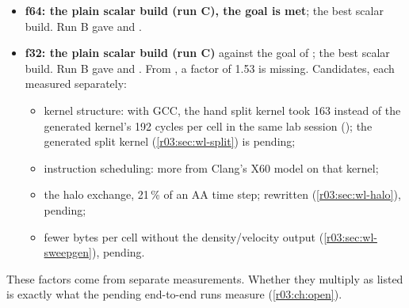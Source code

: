 \begin{keyidea}
\begin{itemize}
  \item \textbf{f64:  the plain scalar build (run C), the  goal is met};
         the best scalar build. Run B gave  and .
  \item \textbf{f32:  the plain scalar build (run C)} against the goal of ;
         the best scalar build. Run B gave  and . From , a
        factor of 1.53 is missing. Candidates, each measured separately:
        \begin{itemize}
          \item kernel structure: with GCC, the hand split kernel took 163 instead of the
                generated kernel's 192 cycles per cell in the same lab session (); the
                generated split kernel (\cref{r03:sec:wl-split}) is pending;
          \item instruction scheduling:  more from Clang's X60 model on that kernel;
          \item the halo exchange, 21\,\% of an AA time step; rewritten
                (\cref{r03:sec:wl-halo}), pending;
          \item fewer bytes per cell without the density/velocity output
                (\cref{r03:sec:wl-sweepgen}), pending.
        \end{itemize}
\end{itemize}
These factors come from separate measurements. Whether they multiply as listed is exactly what
the pending end-to-end runs measure (\cref{r03:ch:open}).
\end{keyidea}
